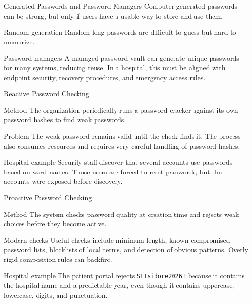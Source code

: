 \documentclass[presentation]{beamer}
\begin{document}
\begin{frame}[c]{Generated Passwords and Password Managers}
  Computer-generated passwords can be strong, but only if users have a usable way to store and use them.

  \begin{block}{Random generation}
    Random long passwords are difficult to guess but hard to memorize.
  \end{block}

  \begin{block}{Password managers}
    A managed password vault can generate unique passwords for many systems, reducing reuse. In a hospital, this must be aligned with endpoint security, recovery procedures, and emergency access rules.
  \end{block}
\end{frame}

\begin{frame}[c]{Reactive Password Checking}
  \begin{block}{Method}
    The organization periodically runs a password cracker against its own password hashes to find weak passwords.
  \end{block}

  \begin{block}{Problem}
    The weak password remains valid until the check finds it. The process also consumes resources and requires very careful handling of password hashes.
  \end{block}

  \begin{exampleblock}{Hospital example}
    Security staff discover that several accounts use passwords based on ward names. Those users are forced to reset passwords, but the accounts were exposed before discovery.
  \end{exampleblock}
\end{frame}

\begin{frame}[c]{Proactive Password Checking}
  \begin{block}{Method}
    The system checks password quality at creation time and rejects weak choices before they become active.
  \end{block}

  \begin{block}{Modern checks}
    Useful checks include minimum length, known-compromised password lists, blocklists of local terms, and detection of obvious patterns. Overly rigid composition rules can backfire.
  \end{block}

  \begin{exampleblock}{Hospital example}
    The patient portal rejects \texttt{StIsidore2026!} because it contains the hospital name and a predictable year, even though it contains uppercase, lowercase, digits, and punctuation.
  \end{exampleblock}
\end{frame}
\end{document}
